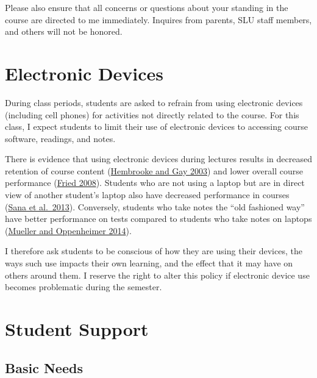 \documentclass[]{book}
\begin{document}
Please also ensure that all concerns or questions about your standing in the course are directed to me immediately. Inquires from parents, SLU staff members, and others will not be honored.

\hypertarget{electronic-devices}{%
\section{Electronic Devices}\label{electronic-devices}}

During class periods, students are asked to refrain from using electronic devices (including cell phones) for activities not directly related to the course. For this class, I expect students to limit their use of electronic devices to accessing course software, readings, and notes.

There is evidence that using electronic devices during lectures results in decreased retention of course content (\href{https://link.springer.com/article/10.1007/BF02940852}{Hembrooke and Gay 2003}) and lower overall course performance (\href{https://www.sciencedirect.com/science/article/pii/S0360131506001436}{Fried 2008}). Students who are not using a laptop but are in direct view of another student's laptop also have decreased performance in courses (\href{https://www.sciencedirect.com/science/article/pii/S0360131512002254}{Sana et al.~2013}). Conversely, students who take notes the ``old fashioned way'' have better performance on tests compared to students who take notes on laptops (\href{http://journals.sagepub.com/doi/abs/10.1177/0956797614524581}{Mueller and Oppenheimer 2014}).

I therefore ask students to be conscious of how they are using their devices, the ways such use impacts their own learning, and the effect that it may have on others around them. I reserve the right to alter this policy if electronic device use becomes problematic during the semester.

\hypertarget{student-support}{%
\section{Student Support}\label{student-support}}

\hypertarget{basic-needs}{%
\subsection{Basic Needs}\label{basic-needs}}
\end{document}
